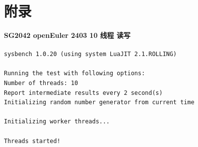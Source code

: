 \documentclass{article}
\begin{document}
\newpage
\appendix

\section{附录}

\paragraph{SG2042 openEuler 2403 10 线程 读写}

\begin{verbatim}
sysbench 1.0.20 (using system LuaJIT 2.1.ROLLING)

Running the test with following options:
Number of threads: 10
Report intermediate results every 2 second(s)
Initializing random number generator from current time

Initializing worker threads...

Threads started!


\end{verbatim}
\end{document}
